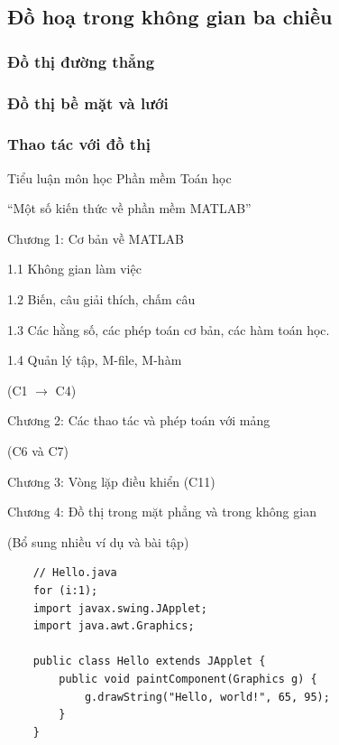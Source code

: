 \documentclass[12pt,a4paper]{article}
\begin{document}
\subsection{Đồ hoạ trong không gian ba chiều}
\subsubsection{Đồ thị đường thẳng}
\subsubsection{Đồ thị bề mặt và lưới}
\subsubsection{Thao tác với đồ thị}

	
	
	Tiểu luận môn học Phần mềm Toán học

“Một số kiến thức về phần mềm MATLAB”

Chương 1: Cơ bản về MATLAB

1.1  Không gian làm việc

1.2  Biến, câu giải thích, chấm câu

1.3  Các hằng số, các phép toán cơ bản, các hàm toán học.

1.4  Quản lý tập, M-file, M-hàm

(C1 $\rightarrow$ C4)

Chương 2: Các thao tác và phép toán với mảng

(C6 và C7)

Chương 3: Vòng lặp điều khiển (C11)

Chương 4: Đồ thị trong mặt phẳng và trong không gian

(Bổ sung nhiều ví dụ và bài tập)
	\begin{lstlisting}
	// Hello.java
	for (i:1);
	import javax.swing.JApplet;
	import java.awt.Graphics;

	public class Hello extends JApplet {
    	public void paintComponent(Graphics g) {
        	g.drawString("Hello, world!", 65, 95);
    	}    
	}
	\end{lstlisting}
	
\end{document}
